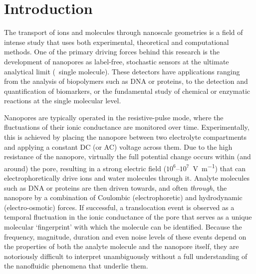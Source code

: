 \documentclass[journal=ancac3,manuscript=article,etalmode=truncate,maxauthors=0,layout=onecolumn]{achemso}
\begin{document}
\section{Introduction}

The transport of ions and molecules through nanoscale geometries is a field of intense study that uses both
experimental, theoretical and computational methods.\cite{Sparreboom-2010,Bocquet-2010,Maffeo-2012,
Thomas-2014,Wang-2014,Kim-2015} One of the primary driving forces behind this research is the development of
nanopores as label-free, stochastic sensors at the ultimate analytical limit (\ie{}~single molecule).
\cite{Bayley-2001,Dekker-2007,Venkatesan-2011,Zhang-2016} These detectors have applications ranging from the
analysis of biopolymers such as
DNA\cite{Deamer-2016,Kasianowicz-1996,Meller-2000,Maglia-2008,Butler-2008,Stoddart-2009,Franceschini-2013,Jain-2018}
or proteins,\cite{Restrepo-Perez-2018,Talaga-2009,Rodriguez-Larrea-2013, Nivala-2013,Kennedy-2016} to the
detection and quantification of
biomarkers,\cite{Chen-2013,Soskine-2012,Niedzwiecki-2013,VanMeervelt-2014,Huang-2017,Liu-2018,Galenkamp-2018}
or the fundamental study of chemical or enzymatic reactions at the single molecular
level.\cite{Willems-VanMeervelt-2017,Lieberman-2010, Nivala-2013,Ho-2015,Laszlo-2017}

Nanopores are typically operated in the resistive-pulse mode, where the fluctuations of their ionic
conductance are monitored over time.\cite{Bayley-2001,Dekker-2007,Maglia-2010,Venkatesan-2011} Experimentally,
this is achieved by placing the nanopore between two electrolyte compartments and applying a constant DC (or
AC) voltage across them. Due to the high resistance of the nanopore, virtually the full potential change
occurs within (and around) the pore, resulting in a strong electric field ($10^6$--$10^7$~\si{\V\per\m})
that can electrophoretically drive ions and water molecules through
it.\cite{Wong-2007,Mao-2014,Haywood-2014,Laohakunakorn-2015} Analyte molecules such as DNA or proteins are
then driven towards, and often \emph{through}, the nanopore by a combination of Coulombic (electrophoretic)
and hydrodynamic (electro-osmotic) forces.\cite{Wong-2007,Grosberg-2010,Muthukumar-2010, Muthukumar-2014} If
successful, a translocation event is observed as a temporal fluctuation in the ionic conductance of the pore
that serves as a unique molecular `fingerprint' with which the molecule can be identified.\cite{Yusko-2017}
Because the frequency, magnitude, duration and even noise levels\cite{Yusko-2017,Houghtaling-2019} of these
events depend on the properties of both the analyte molecule and the nanopore itself, they are notoriously
difficult to interpret unambiguously without a full understanding of the nanofluidic phenomena that underlie
them.
\end{document}
